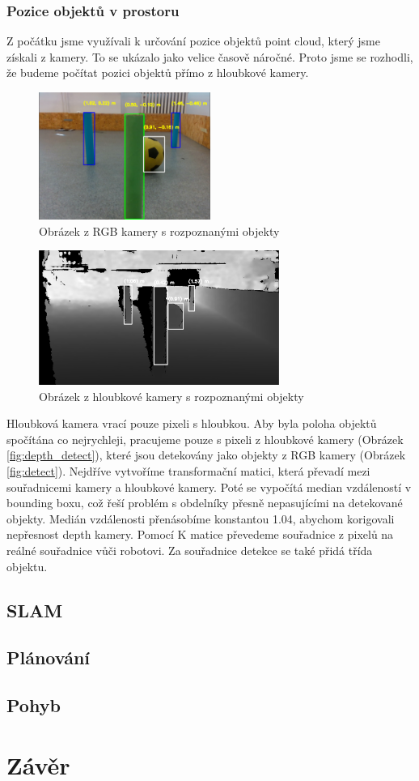 \documentclass[a4paper,12pt]{article}
\begin{document}
\subsubsection{Pozice objektů v prostoru}
\label{sec:point_cloud}
Z počátku jsme využívali k určování pozice objektů point cloud, který jsme získali z kamery.
To se ukázalo jako velice časově náročné. Proto jsme se rozhodli, že budeme počítat pozici objektů přímo z hloubkové kamery.
\begin{figure}[H]
    \centering
    \includegraphics[width=0.5\textwidth]{pictures/detect.png}
    \caption{Obrázek z RGB kamery s rozpoznanými objekty}
    \label{fig:detect}
\end{figure}
\begin{figure}[H]
    \centering
    \includegraphics[width=0.7\textwidth]{pictures/depth_detect.png}
    \caption{Obrázek z hloubkové kamery s rozpoznanými objekty}
    \label{fig:depth_detect}
\end{figure}
Hloubková kamera vrací pouze pixeli s hloubkou. Aby byla poloha objektů spočítána co nejrychleji, pracujeme pouze s pixeli z hloubkové kamery (Obrázek \eqref{fig:depth_detect}), které jsou detekovány jako objekty z RGB kamery (Obrázek \eqref{fig:detect}).
Nejdříve vytvoříme transformační matici, která převadí mezi souřadnicemi kamery a hloubkové kamery. Poté se vypočítá median vzdáleností v bounding boxu, což řeší problém s obdelníky přesně nepasujícími na detekované objekty. 
Medián vzdálenosti přenásobíme konstantou 1.04, abychom korigovali nepřesnost depth kamery.
Pomocí K matice převedeme souřadnice z pixelů na reálné souřadnice vůči robotovi. Za souřadnice detekce se také přidá třída objektu.



\subsection{SLAM}
\subsection{Plánování}
\subsection{Pohyb}
\section{Závěr}
\end{document}
